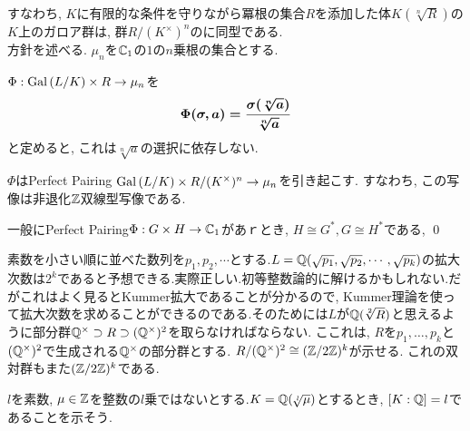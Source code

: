 すなわち, $K$に有限的な条件を守りながら冪根の集合$R$を添加した体$K(\sqrt[n]{R})$の$K$上のガロア群は, 群$R/(K^{\times})^n$のに同型である. \\
\prf
方針を述べる. $\mu_n$を$\mathbb{C}_1$の$1$の$n$乗根の集合とする.
\ben
\item $\Phi:\operatorname{Gal}{(L/K)}\times R\to \mu_n$を
\[{\mbox{\boldmath $\Phi(\sigma, a) = \dfrac{\sigma(\sqrt[n]{a})}{\sqrt[n]{a}}$}}\]
と定めると, これは$\sqrt[n]{a}$の選択に依存しない.
\item $\Phi$はPerfect Pairing $\operatorname{Gal}{(L/K)}\times R/(K^{\times})^n \to \mu_n$を引き起こす. すなわち, この写像は非退化$\mathbb{Z}$双線型写像である.
\item 一般にPerfect Pairing$\Phi:G\times H \to \mathbb{C}_1$があｒとき, $H\cong G^{\ast}, G\cong H^{\ast}$である,
\een
\qed


\begin{eg}
素数を小さい順に並べた数列を$p_1,p_2,\cdots$とする.$L = \mathbb{Q}(\sqrt{p_1},\sqrt{p_2},\cdots, \sqrt{p_k})$の拡大次数は$2^{k}$であると予想できる.実際正しい.初等整数論的に解けるかもしれない.だがこれはよく見るとKummer拡大であることが分かるので,  Kummer理論を使って拡大次数を求めることができるのである.そのためには$L$が$\mathbb{Q}(\sqrt[2]{R})$と思えるように部分群$\mathbb{Q}^{\times} \supset R \supset (\mathbb{Q}^{\times})^{2}$を取らなければならない. ここれは, $R$を$p_1,\dots, p_k$と$(\mathbb{Q}^{\times})^2$で生成される$\mathbb{Q}^{\times}$の部分群とする. $R/(\mathbb{Q}^{\times})^2 \cong (\mathbb{Z}/2\mathbb{Z})^k$が示せる. これの双対群もまた$(\mathbb{Z}/2\mathbb{Z})^k$である.
\end{eg}

\begin{eg}
$l$を素数, $\mu\in \mathbb{Z}$を整数の$l$乗ではないとする.$K=\mathbb{Q}(\sqrt[l]{\mu})$とするとき, $[K:\mathbb{Q}] = l$であることを示そう.
\end{eg}



